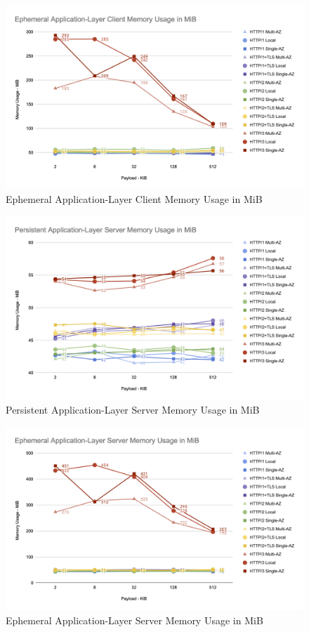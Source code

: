 \begin{figure}[h!]
    \centering
    \includegraphics[width=\linewidth]{figures/charts/Ephemeral Application-Layer Client Memory Usage in MiB.png}
    \caption{Ephemeral Application-Layer Client Memory Usage in MiB}
    \label{fig:ephemeral_client_app_memory}
\end{figure}

\clearpage

\begin{figure}[h!]
    \centering
    \includegraphics[width=\linewidth]{figures/charts/Persistent Application-Layer Server Memory Usage in MiB.png}
    \caption{Persistent Application-Layer Server Memory Usage in MiB}
    \label{fig:persistent_server_app_memory}
\end{figure}

\begin{figure}[h!]
    \centering
    \includegraphics[width=\linewidth]{figures/charts/Ephemeral Application-Layer Server Memory Usage in MiB.png}
    \caption{Ephemeral Application-Layer Server Memory Usage in MiB}
    \label{fig:ephemeral_server_app_memory}
\end{figure}

\clearpage
